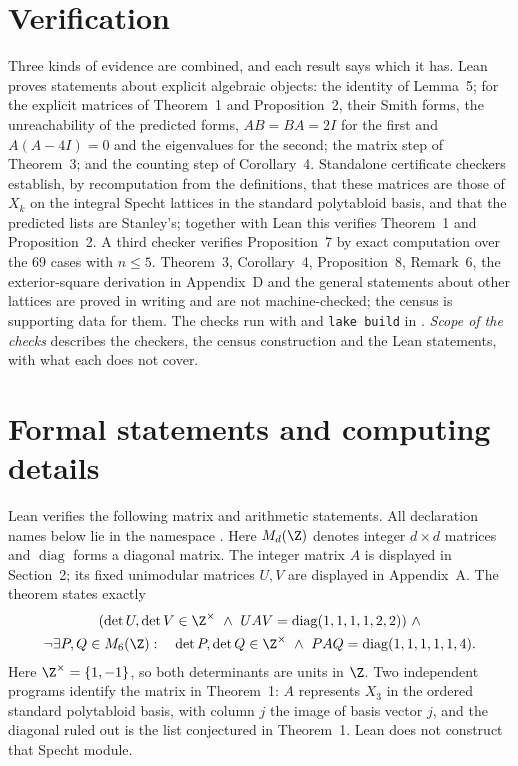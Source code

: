 \section{Verification}\label{sec:verify}

Three kinds of evidence are combined, and each result says which it has.
Lean proves statements about explicit algebraic objects: the identity of
Lemma~5; for the explicit matrices of
Theorem~1 and Proposition~2, their Smith forms, the
unreachability of the predicted forms, $AB=BA=2I$ for the first and
$A(A-4I)=0$ and the eigenvalues for the second; the matrix step of
Theorem~3; and the counting step of Corollary~4.
Standalone certificate checkers establish, by recomputation from the
definitions, that these matrices are those of $X_k$ on the integral Specht
lattices in the standard polytabloid basis, and that the predicted lists are
Stanley's; together with Lean this verifies Theorem~1 and
Proposition~2. A third checker verifies
Proposition~7 by exact computation over the 69 cases with
$n\le5$. Theorem~3, Corollary~4,
Proposition~8, Remark~6, the
exterior-square derivation in Appendix~D and the general statements about other
lattices are proved in writing and are not machine-checked; the census is
supporting data for them. The checks run with  and
\texttt{lake build} in . \emph{Scope of the checks} describes the
checkers, the census construction and the Lean statements, with what each
does not cover.


\section{Formal statements and computing details}\label{sec:formal-statements}
Lean verifies the following matrix and arithmetic statements. All declaration names below lie in the namespace . Here $M_d(\Z)$ denotes integer $d\times d$ matrices
and $\operatorname{diag}$ forms a diagonal matrix.
The integer matrix $A$ is displayed in Section~2; its fixed
unimodular matrices $U,V$ are displayed in Appendix~A. The theorem  states exactly
\[
\begin{gathered}
(\det U,\det V\in\Z^\times\ \land\ UAV=\operatorname{diag}(1,1,1,1,2,2))\ \land\\
\neg\exists P,Q\in M_6(\Z):\quad
\det P,\det Q\in\Z^\times\ \land\ PAQ=\operatorname{diag}(1,1,1,1,1,4).
\end{gathered}
\]
Here $\Z^\times=\{1,-1\}$, so both determinants are units in $\Z$.
Two independent programs identify the matrix in Theorem~1:
$A$ represents $X_3$ in the ordered standard polytabloid basis, with column
$j$ the image of basis vector $j$, and the diagonal ruled out is the list conjectured in Theorem~1.
Lean does not construct that Specht module.

